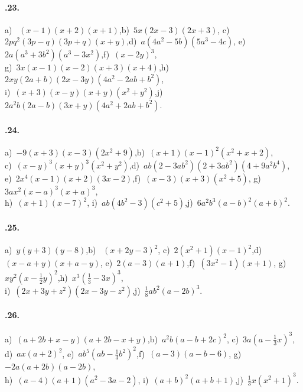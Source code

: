 \paragraph{\thechapter.23.} a)~ $(x-1)(x+2)(x+1)$,\quad b)~$5x(2x-3)(2x+3)$,\quad
c)~$2{pq}^{2}(3p-q)(3p+q)(x+y)$,\quad d)~$a(4a^{2}-5b)(5a^{3}-4c)$,\quad
e)~$2a(a^{3}+3b^{2})(a^{3}-3x^{2})$,\quad f)~$(x-2y)^{3}$,\quad \protect\\
g)~$3x(x-1)(x-2)(x+3)(x+4)$,\quad h)~$2xy(2a+b)(2x-3y)(4a^{2}-2{ab}+b^{2})$,\quad \protect\\
i)~$(x+3)(x-y)(x+y)(x^{2}+y^{2})$,\quad j)~$2a^{2}b(2a-b)(3x+y)(4a^{2}+2{ab}+b^{2})$.

\paragraph{\thechapter.24.} a)~$-9(x+3)(x-3)(2x^{2}+9)$,\quad b)~$(x+1)(x-1)^{2}(x^{2}+x+2)$,\quad \protect\\
c)~$(x-y)^{3}(x+y)^{3}(x^{2}+y^{2})$,\quad d)~${ab}(2-3{ab}^{2})(2+3{ab}^{2})(4+9a^{2}b^{4})$,\quad \protect\\
e)~$2x^{4}(x-1)(x+2)(3x-2)$,\quad f)~$(x-3)(x+3)(x^{2}+5)$,\quad
g)~$3ax^{2}(x-a)^{3}(x+a)^{3}$,\protect\\
h)~$(x+1)(x-7)^{2}$,\quad
i)~${ab}(4b^{2}-3)(c^{2}+5)$,\quad j)~$6a^{2}b^{3}(a-b)^{2}(a+b)^{2}$.

\paragraph{\thechapter.25.} a)~$y(y+3)(y-8)$,\quad b)~ $(x+2y-3)^{2}$,\quad
c)~$2(x^{2}+1)(x-1)^{2}$,\quad d)~$(x-a+y)(x+a-y)$,\quad
e)~$2(a-3)(a+1)$,\quad f)~$(3x^{2}-1)(x+1)$,\quad
g)~$xy^{2}(x-\frac{1}{2}y)^{2}$,\quad h)~$x^{3}\left(\frac{1}{3}-3x\right)^{3}$,\protect\\
i)~$(2x+3y+z^{2})(2x-3y-z^{2})$,\quad j)~$\frac{1}{8}{ab}^{2}(a-2b)^{3}$.

\paragraph{\thechapter.26.} a)~$(a+2b+x-y)(a+2b-x+y)$,\quad b)~$a^{2}b(a-b+2c)^{2}$,\quad
c)~$3a\left(a-\frac{1}{3}x\right)^{3}$,\protect\\
d)~$ax(a+2)^{2}$,\quad
e)~${ab}^{5}\left({ab}-\frac{1}{3}b^{2}\right)^{2}$,\quad f)~$(a-3)(a-b-6)$,\quad
g)~$-2a(a+2b)(a-2b)$,\protect\\
h)~$(a-4)(a+1)(a^{2}-3a-2)$,\quad
i)~$(a+b)^{2}(a+b+1)$,\quad j)~$\frac{1}{3}x(x^{2}+1)^{3}$.

